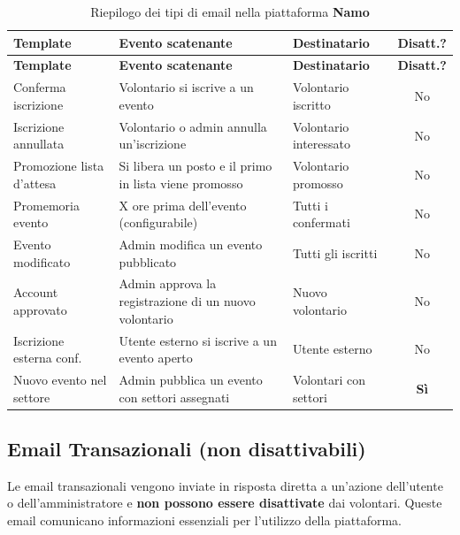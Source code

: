 \documentclass[a4paper,11pt,oneside]{book}
\newcommand{\namo}{\textbf{Namo}}
\begin{document}
\begin{longtable}{p{4.2cm} p{4.5cm} p{3cm} c}
\caption{Riepilogo dei tipi di email nella piattaforma \namo{}} \label{tab:riepilogo-email} \\
\toprule
\textbf{Template} & \textbf{Evento scatenante} & \textbf{Destinatario} & \textbf{Disatt.?} \\
\midrule
\endfirsthead
\toprule
\textbf{Template} & \textbf{Evento scatenante} & \textbf{Destinatario} & \textbf{Disatt.?} \\
\midrule
\endhead
Conferma iscrizione        & Volontario si iscrive a un evento                            & Volontario iscritto      & No  \\[4pt]
Iscrizione annullata       & Volontario o admin annulla un'iscrizione                      & Volontario interessato   & No  \\[4pt]
Promozione lista d'attesa  & Si libera un posto e il primo in lista viene promosso         & Volontario promosso      & No  \\[4pt]
Promemoria evento          & X ore prima dell'evento (configurabile)                       & Tutti i confermati       & No  \\[4pt]
Evento modificato          & Admin modifica un evento pubblicato                           & Tutti gli iscritti       & No  \\[4pt]
Account approvato          & Admin approva la registrazione di un nuovo volontario         & Nuovo volontario         & No  \\[4pt]
Iscrizione esterna conf.   & Utente esterno si iscrive a un evento aperto                  & Utente esterno           & No  \\[4pt]
Nuovo evento nel settore   & Admin pubblica un evento con settori assegnati                & Volontari con settori    & \textbf{S\`i} \\
\bottomrule
\end{longtable}

\subsection{Email Transazionali (non disattivabili)}
\label{sec:email-transazionali}

Le email transazionali vengono inviate in risposta diretta a un'azione dell'utente o dell'amministratore e \textbf{non possono essere disattivate} dai volontari. Queste email comunicano informazioni essenziali per l'utilizzo della piattaforma.
\end{document}
